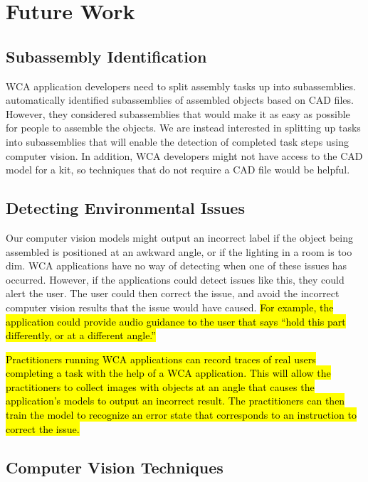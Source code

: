\section{Future Work}

\subsection{Subassembly Identification}

WCA application developers need to split assembly tasks up into subassemblies.
\citet{subassembly_identification} automatically identified subassemblies of
assembled objects based on CAD files.
However, they considered subassemblies that would make it as easy as possible
for people to assemble the objects.
We are instead interested in splitting up tasks into subassemblies that will
enable the detection of completed task steps using computer vision.
In addition, WCA developers might not have access to the CAD model for a kit, so
techniques that do not require a CAD file would be helpful.

\subsection{Detecting Environmental Issues}

Our computer vision models might output an incorrect label if the object being
assembled is positioned at an awkward angle, or if the lighting in a room is
too dim.
WCA applications have no way of detecting when one of these issues has
occurred.
However, if the applications could detect issues like this, they could alert the
user.
The user could then correct the issue, and avoid the incorrect computer vision
results that the issue would have caused.
\hl{
  For example, the application could provide audio guidance to the user that
  says ``hold this part differently, or at a different angle.''
}

\hl{
  Practitioners running WCA applications can record traces of real users
  completing a task with the help of a WCA application.
  This will allow the practitioners to collect images with objects at an angle
  that causes the application's models to output an incorrect result.
  The practitioners can then train the model to recognize an error state that
  corresponds to an instruction to correct the issue.
}

\subsection{Computer Vision Techniques}

